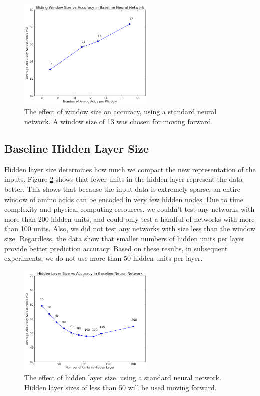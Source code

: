 \documentclass[letterpaper,twocolumn,12pt]{article}
\begin{document}
\begin{figure}[ht!]
\centering
\includegraphics[width=65mm]{results/baseline/baseline_windowSize.png}
\caption{The effect of window size on accuracy, using a standard neural network. A window size of 13 was chosen for moving forward.}
\label{fig:baseline_window_size}
\end{figure}

\subsection{Baseline Hidden Layer Size}
Hidden layer size determines how much we compact the new representation of the inputs.
Figure \ref{fig:baseline_hidden_layer_size} shows that fewer units in the hidden layer represent the data better.
This shows that because the input data is extremely sparse, an entire window of amino acids can be encoded in very few hidden nodes.
Due to time complexity and physical computing resources, we couldn't test any networks with more than 200 hidden units, and could only test a handful of networks with more than 100 units.
Also, we did not test any networks with size less than the window size.
Regardless, the data show that smaller numbers of hidden units per layer provide better prediction accuracy.
Based on these results, in subsequent experiments, we do not use more than 50 hidden units per layer.

\begin{figure}[ht!]
\centering
\includegraphics[width=65mm]{results/baseline/baseline_hiddenLayerSize.png}
\caption{The effect of hidden layer size, using a standard neural network.  Hidden layer sizes of less than 50 will be used moving forward.}
\label{fig:baseline_hidden_layer_size}
\end{figure}
\end{document}
